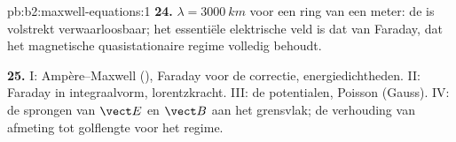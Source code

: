 \begin{solution}{pb:b2:maxwell-equations:1}
\textbf{24.} $\lambda = \qty{3000}{km}$ voor een ring van een meter: de
 is volstrekt verwaarloosbaar; het essentiële elektrische
veld is dat van Faraday, dat het magnetische quasistationaire regime
volledig behoudt.

\textbf{25.} I: Ampère--Maxwell (), Faraday voor de
correctie, energiedichtheden. II: Faraday in integraalvorm, lorentzkracht.
III: de potentialen, Poisson (Gauss). IV: de sprongen van $\vect E$ en
$\vect B$ aan het grensvlak; de verhouding van afmeting tot golflengte voor
het regime.
\end{solution}
